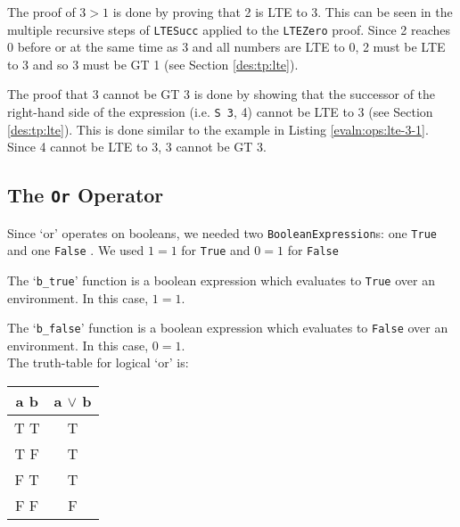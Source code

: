         
        The proof of $3 > 1$ is done by proving that 2 is LTE to 3. This can be seen in the multiple recursive steps of \texttt{LTESucc} applied to the \texttt{LTEZero} proof. Since 2 reaches 0 before or at the same time as 3 and all numbers are LTE to 0, 2 must be LTE to 3 and so 3 must be GT 1 (see Section \ref{des:tp:lte}).
        
        \newpage
        
        
        The proof that 3 cannot be GT 3 is done by showing that the successor of the right-hand side of the expression (i.e. \texttt{S 3}, 4) cannot be LTE to 3 (see Section \ref{des:tp:lte}). This is done similar to the example in Listing \ref{evaln:ops:lte-3-1}. Since 4 cannot be LTE to 3, 3 cannot be GT 3.
    
    \subsection{The \texttt{Or} Operator}\label{evaln:ops:or}
        Since `or' operates on booleans, we needed two \texttt{BooleanExpression}s: one \texttt{True} and one \texttt{False} . We used $1 = 1$ for \texttt{True} and $0 = 1$ for \texttt{False}
        
        
        The `\texttt{b\_true}' function is a boolean expression which evaluates to \texttt{True} over an environment. In this case, $1 = 1$.
        
        \newpage
        
        
        The `\texttt{b\_false}' function is a boolean expression which evaluates to \texttt{False} over an environment. In this case, $0 = 1$.
        \\
    
        The truth-table for logical `or' is:
        \begin{center}
            \begin{tabular}{c | c}
                a b & a $\lor$ b \\
                \hline
                T T & T \\
                T F & T \\
                F T & T \\
                F F & F \\
            \end{tabular}
        \end{center}
    
